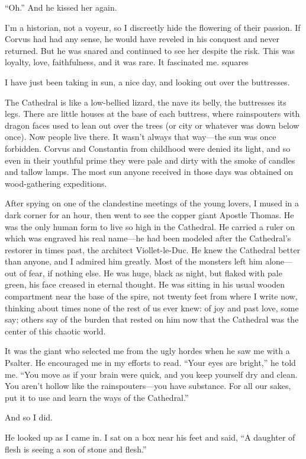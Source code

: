 “Oh.” And he kissed her again.

I’m a historian, not a voyeur, so I discreetly hide the flowering of their passion. If Corvus had had any sense, he would have reveled in his conquest and never returned. But he was snared and continued to see her despite the risk. This was loyalty, love, faithfulness, and it was rare. It fascinated me.
squares

I have just been taking in sun, a nice day, and looking out over the buttresses.

The Cathedral is like a low-bellied lizard, the nave its belly, the buttresses its legs. There are little houses at the base of each buttress, where rainspouters with dragon faces used to lean out over the trees (or city or whatever was down below once). Now people live there. It wasn’t always that way—the sun was once forbidden. Corvus and Constantia from childhood were denied its light, and so even in their youthful prime they were pale and dirty with the smoke of candles and tallow lamps. The most sun anyone received in those days was obtained on wood-gathering expeditions.

After spying on one of the clandestine meetings of the young lovers, I mused in a dark corner for an hour, then went to see the copper giant Apostle Thomas. He was the only human form to live so high in the Cathedral. He carried a ruler on which was engraved his real name—he had been modeled after the Cathedral’s restorer in times past, the architect Viollet-le-Duc. He knew the Cathedral better than anyone, and I admired him greatly. Most of the monsters left him alone—out of fear, if nothing else. He was huge, black as night, but flaked with pale green, his face creased in eternal thought. He was sitting in his usual wooden compartment near the base of the spire, not twenty feet from where I write now, thinking about times none of the rest of us ever knew: of joy and past love, some say; others say of the burden that rested on him now that the Cathedral was the center of this chaotic world.

It was the giant who selected me from the ugly hordes when he saw me with a Psalter. He encouraged me in my efforts to read. “Your eyes are bright,” he told me. “You move as if your brain were quick, and you keep yourself dry and clean. You aren’t hollow like the rainspouters—you have substance. For all our sakes, put it to use and learn the ways of the Cathedral.”

And so I did.

He looked up as I came in. I sat on a box near his feet and said, “A daughter of flesh is seeing a son of stone and flesh.”

